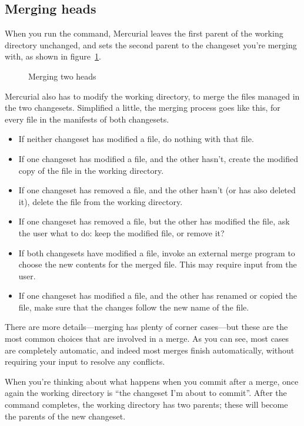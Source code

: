 \subsection{Merging heads}

When you run the  command, Mercurial leaves the first
parent of the working directory unchanged, and sets the second parent
to the changeset you're merging with, as shown in
figure~\ref{fig:concepts:wdir-merge}.

\begin{figure}[ht]
  \centering
  \caption{Merging two heads}
  \label{fig:concepts:wdir-merge}
\end{figure}

Mercurial also has to modify the working directory, to merge the files
managed in the two changesets.  Simplified a little, the merging
process goes like this, for every file in the manifests of both
changesets.
\begin{itemize}
\item If neither changeset has modified a file, do nothing with that
  file.
\item If one changeset has modified a file, and the other hasn't,
  create the modified copy of the file in the working directory.
\item If one changeset has removed a file, and the other hasn't (or
  has also deleted it), delete the file from the working directory.
\item If one changeset has removed a file, but the other has modified
  the file, ask the user what to do: keep the modified file, or remove
  it?
\item If both changesets have modified a file, invoke an external
  merge program to choose the new contents for the merged file.  This
  may require input from the user.
\item If one changeset has modified a file, and the other has renamed
  or copied the file, make sure that the changes follow the new name
  of the file.
\end{itemize}
There are more details---merging has plenty of corner cases---but
these are the most common choices that are involved in a merge.  As
you can see, most cases are completely automatic, and indeed most
merges finish automatically, without requiring your input to resolve
any conflicts.

When you're thinking about what happens when you commit after a merge,
once again the working directory is ``the changeset I'm about to
commit''.  After the  command completes, the working
directory has two parents; these will become the parents of the new
changeset.

